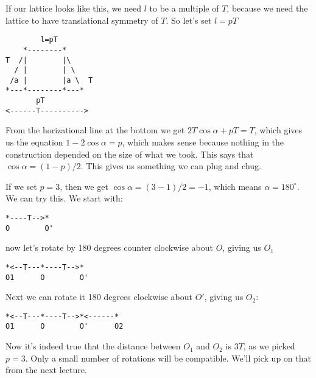 \documentclass{book}
\theoremstyle{definition}
\begin{document}
If our lattice looks like this, we need $l$ to be a multiple of $T$, because we need
the lattice to have translational symmetry of $T$. So let's set $l = pT$

\begin{verbatim}
        l=pT
    *--------*
T  /|        |\
  / |        | \
 /a |        |a \  T
*---*--------*---*
       pT
<------T---------->
\end{verbatim}
From the horizational line at the bottom we get $2T \cos\alpha + pT = T$, which
gives us the equation $1 - 2 \cos \alpha = p$, which makes sense because nothing
in the construction depended on the size of what we took. This says that
$\cos \alpha = (1 - p)/2$. This gives us something we can plug and chug.

If we set $p = 3$, then we get $\cos \alpha = (3-1)/2 = -1$, which means
$\alpha = 180^\circ$. We can try this. We start with:

\begin{verbatim}
*----T-->*
O        O'
\end{verbatim}

now let's rotate by 180 degrees counter clockwise about $O$, giving us $O_1$

\begin{verbatim}
*<--T---*----T-->*
O1      O        O'
\end{verbatim}

Next we can rotate it 180 degrees clockwise about $O'$, giving us $O_2$:

\begin{verbatim}
*<--T---*----T-->*<------*
O1      O        O'      O2
\end{verbatim}

Now it's indeed true that the distance between $O_1$ and $O_2$ is $3T$, as we picked
$p = 3$.  Only a small number of rotations will be compatible. We'll pick up on
that from the next lecture.
\end{document}
